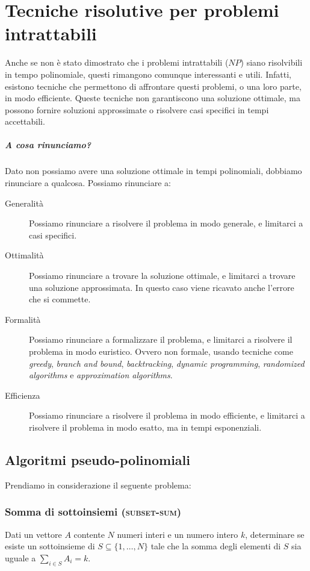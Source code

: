 \chapter{Tecniche risolutive per problemi intrattabili}

Anche se non è stato dimostrato che i problemi intrattabili ($NP$) siano risolvibili in tempo polinomiale, questi rimangono comunque interessanti e utili. Infatti, esistono tecniche che permettono di affrontare questi problemi, o una loro parte, in modo efficiente. Queste tecniche non garantiscono una soluzione ottimale, ma possono fornire soluzioni approssimate o risolvere casi specifici in tempi accettabili.

\paragraph{A cosa rinunciamo?}
Dato non possiamo avere una soluzione ottimale in tempi polinomiali, dobbiamo rinunciare a qualcosa. Possiamo rinunciare a:
\begin{description}
    \item[Generalità] Possiamo rinunciare a risolvere il problema in modo generale, e limitarci a casi specifici.
    \item[Ottimalità] Possiamo rinunciare a trovare la soluzione ottimale, e limitarci a trovare una soluzione approssimata. In questo caso viene ricavato anche l'errore che si commette.
    \item[Formalità] Possiamo rinunciare a formalizzare il problema, e limitarci a risolvere il problema in modo euristico. Ovvero non formale, usando tecniche come \textit{greedy}, \textit{branch and bound}, \textit{backtracking}, \textit{dynamic programming}, \textit{randomized algorithms} e \textit{approximation algorithms}.
    \item[Efficienza] Possiamo rinunciare a risolvere il problema in modo efficiente, e limitarci a risolvere il problema in modo esatto, ma in tempi esponenziali. 
\end{description}

\section{Algoritmi pseudo-polinomiali}
    Prendiamo in considerazione il seguente problema:
    \subsection{Somma di sottoinsiemi (\textsc{subset-sum})}
        Dati un vettore $A$ contente $N$ numeri interi e un numero intero $k$, determinare se esiste un sottoinsieme di $S\subseteq\{1,\ldots,N\}$ tale che la somma degli elementi di $S$ sia uguale a $\sum_{i\in S} A_i = k$.
